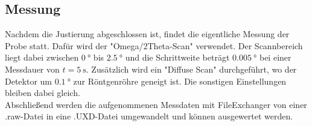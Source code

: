 \subsection{Messung}
Nachdem die Justierung abgeschlossen ist, findet die eigentliche Messung der Probe statt. Dafür wird der "Omega/2Theta-Scan" verwendet. Der Scannbereich liegt dabei zwischen $\SI{0}{\degree}$ bis $\SI{2.5}{\degree}$ und die Schrittweite beträgt $\SI{0.005}{\degree}$ bei einer Messdauer von $t=\SI{5}{\second}$. Zusätzlich wird ein  "Diffuse Scan" durchgeführt, wo der Detektor um $\SI{0.1}{\degree}$ zur Röntgenröhre geneigt ist. Die sonstigen Einstellungen bleiben dabei gleich. \\
Abschließend werden die aufgenommenen Messdaten mit FileExchanger von einer .raw-Datei in eine .UXD-Datei umgewandelt und können ausgewertet werden.

